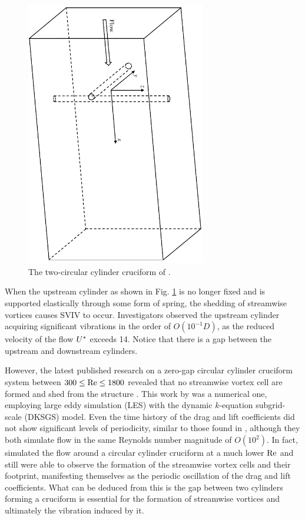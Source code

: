 \documentclass[oneside]{utmthesis}
\begin{document}
\begin{figure}[!h]
  \centering
  \hspace{1cm} \includegraphics[angle=90,width=0.7\textwidth]{figs/twoCrossingCylinders}
  \caption{The two-circular cylinder cruciform of \citet{Zhao2018a}.}
  \label{fig:twoCrossingCylinders}
\end{figure}

When the upstream cylinder as shown in Fig. \ref{fig:twoCrossingCylinders} is no longer fixed and is supported elastically through some form of spring, the shedding of streamwise vortices causes SVIV to occur. Investigators observed the upstream cylinder acquiring significant vibrations in the order of $O(10^{-1}D)$, as the reduced velocity of the flow $U^{*}$ exceeds 14. Notice that there is a gap between the upstream and downstream cylinders.

However, the latest published research on a zero-gap circular cylinder cruciform system between $300 \le \text{Re} \le 1800$ revealed that no streamwise vortex cell are formed and shed from the structure \citep{Tang2021}. This work by \citet{Tang2021} was a numerical one, employing large eddy simulation (LES) with the dynamic $k$-equation subgrid-scale (DKSGS) model. Even the time history of the drag and lift coefficients did not show significant levels of periodicity, similar to those found in \citet{Deng2007}, although they both simulate flow in the same Reynolds number magnitude of $O(10^{2})$. In fact, \citet{Deng2007} simulated the flow around a circular cylinder cruciform at a much lower $\text{Re}$ and still were able to observe the formation of the streamwise vortex cells and their footprint, manifesting themselves as the periodic oscillation of the drag and lift coefficients. What can be deduced from this is the gap between two cylinders forming a cruciform is essential for the formation of streamwise vortices and ultimately the vibration induced by it.
\end{document}

